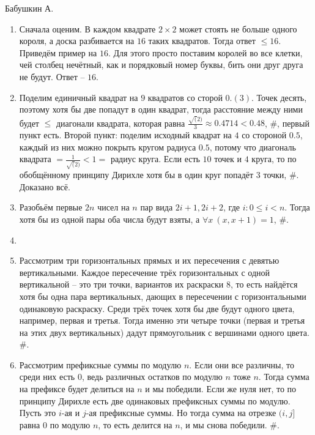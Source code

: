 \documentclass[12pt]{article}
\begin{document}
Бабушкин А.

\begin{enumerate}
	\setlength{\parskip}{0pt} 
	\setlength{\itemsep}{0pt} 
	\item Сначала оценим. В каждом квадрате $2 \times 2$ может стоять не больше одного короля, а доска разбивается на $16$ таких квадратов. Тогда ответ $\le 16$. Приведём пример на $16$. Для этого просто поставим королей во все клетки, чей столбец нечётный, как и порядковый номер буквы, бить они друг друга не будут. Ответ -- $16$. \\
	\item Поделим единичный квадрат на $9$ квадратов со сторой $0.(3)$. Точек десять, поэтому хотя бы две попадут в один квадрат, тогда расстояние между ними будет $\le$ диагонали квадрата, которая равна $\frac{\sqrt(2)}{3}  \approx 0.4714 < 0.48$, \#, первый пункт есть. Второй пункт: поделим исходный квадрат на $4$ со стороной $0.5$, каждый из них можно покрыть кругом радиуса $0.5$, потому что диагональ квадрата $= \frac{1}{\sqrt(2)} < 1 =$ радиус круга. Если есть $10$ точек и $4$ круга, то по обобщённому принципу Дирихле хотя бы в один круг попадёт $3$ точки, \#. Доказано всё. \\
	\item Разобьём первые $2n$ чисел на $n$ пар вида $2i + 1, 2i + 2$, где $i : 0 \le i < n$. Тогда хотя бы из одной пары оба числа будут взяты, а $\forall x~(x, x + 1) = 1$, \#.\\
	\item ~\\
	\item Рассмотрим три горизонтальных прямых и их пересечения с девятью вертикальными. Каждое пересечение трёх горизонтальных с одной вертикальной -- это три точки, вариантов их раскраски $8$, то есть найдётся хотя бы одна пара вертикальных, дающих в пересечении с горизонтальными одинаковую раскраску. Среди трёх точек хотя бы две будут одного цвета, например, первая и третья. Тогда именно эти четыре точки (первая и третья на этих двух вертикальных) дадут прямоугольник с вершинами одного цвета. \#.  \\
	\item Рассмотрим префиксные суммы по модулю $n$. Если они все различны, то среди них есть $0$, ведь различных остатков по модулю $n$ тоже $n$. Тогда сумма на префиксе будет делиться на $n$ и мы победили. Если же нуля нет, то по принципу Дирихле есть две одинаковых префиксных суммы по модулю. Пусть это $i$-ая и $j$-ая префиксные суммы. Но тогда сумма на отрезке $(i, j]$ равна $0$ по модулю $n$, то есть делится на $n$, и мы снова победили. \#.
\end{enumerate}
\end{document}
